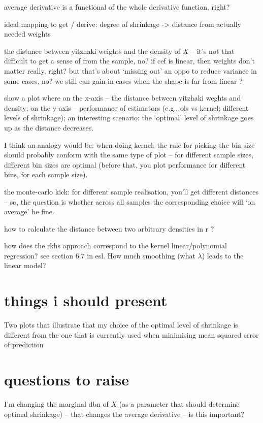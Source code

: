 \documentclass[a4paper,12pt,twoside]{article}
\begin{document}
average derivative is a functional of the whole derivative function, right?

ideal mapping to get / derive: degree of shrinkage -> distance from actually needed weights

the distance between yitzhaki weights and the density of $X$ -- it's not that difficult to get a sense of from the sample, no? if cef is linear, then weights don't matter really, right? but that's about `missing out' an oppo to reduce variance in some cases, no? we still can gain in cases when the shape is far from linear ?

show a plot where on the x-axis -- the distance between yitzhaki weghts and density; on the y-axis -- performance of estimators (e.g., ols vs kernel; different levels of shrinkage); an interesting scenario: the `optimal' level of shrinkage goes up as the distance decreases.

I think an analogy would be: when doing kernel, the rule for picking the bin size should probably conform with the same type of plot -- for different sample sizes, different bin sizes are optimal (before that, you plot performance for different bins, for each sample size).

the monte-carlo kick: for different sample realisation, you'll get different distances -- so, the question is whether across all samples the corresponding choice will `on average' be fine.

how to calculate the distance between two arbitrary densities in r ?

how does the rkhs approach correspond to the kernel linear/polynomial regression? see section 6.7 in esl. How much smoothing (what $\lambda$) leads to the linear model?


\section*{things i should present}

Two plots that illustrate that my choice of the optimal level of shrinkage is different from the one that is currently used when minimising mean squared error of prediction

\section*{questions to raise}

I'm changing the marginal dbn of $X$ (as a parameter that should determine optimal shrinkage) -- that changes the average derivative -- is this important?
\end{document}
